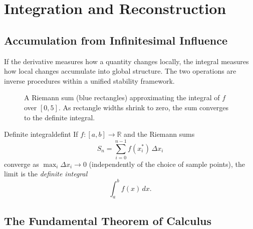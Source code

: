 \documentclass[12pt,openany]{book}
\newcommand{\R}{\mathbb{R}}
\begin{document}
\chapter{Integration and Reconstruction}
\label{ch:integration}

\section{Accumulation from Infinitesimal Influence}

If the derivative measures how a quantity changes locally, the integral measures
how local changes accumulate into global structure. The two operations are
inverse procedures within a unified stability framework.

\begin{figure}[H]
\centering
{}
\caption{A Riemann sum (blue rectangles) approximating the integral of $f$ over
$[0,5]$. As rectangle widths shrink to zero, the sum converges to the definite
integral.}
\label{fig:riemann}
\end{figure}

\begin{definition}{Definite integral}{defint}
  If $f:[a,b]\to\R$ and the Riemann sums
  \[
    S_n = \sum_{i=0}^{n-1} f(x_i^*)\,\Delta x_i
  \]
  converge as $\max_i \Delta x_i\to 0$ (independently of the choice of sample
  points), the limit is the \emph{definite integral}
  \[
    \int_a^b f(x)\,dx.
  \]
\end{definition}

\section{The Fundamental Theorem of Calculus}
\end{document}
